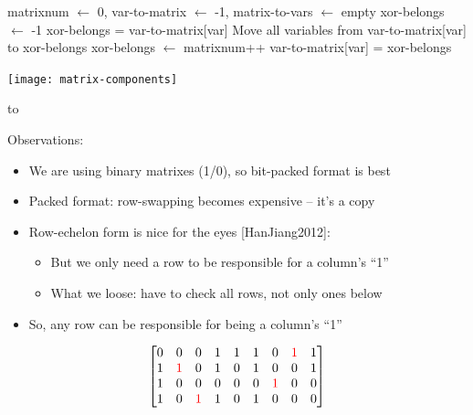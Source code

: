 \documentclass[aspectratio=196]{slides}
\def\TITLE#1{\hbox to \linewidth{\large #1\hfill}}
\def\BOTTOM{\vfill\newpage}
\def\SLIDE#1{\BOTTOM\TITLE{#1}}
\begin{document}
\begin{minipage}{0.7\textwidth}
\begin{algorithmic}[1]
    \State matrixnum $\gets$ 0, var-to-matrix $\gets$ -1, matrix-to-vars $\gets$ empty
        \State xor-belongs $\gets$ -1
                 {xor-belongs = var-to-matrix[var]}
                    \State Move all variables from var-to-matrix[var] to xor-belongs
                \EndIf
            \EndIf
        \EndFor
            \State xor-belongs $\gets$ matrixnum++
        \EndIf
            \State var-to-matrix[var] = xor-belongs
        \EndFor
    \EndFor \label{line:findonexor-base-end}
\EndFunction
\end{algorithmic}
\end{minipage}
\begin{minipage}{0.3\textwidth}
\texttt{[image: matrix-components]}
\end{minipage}
\vfill
\newpage
\SLIDE{CDCL(T) Gauss-Jordan Elimination: None of that row swapping please!}
\vspace{2ex}

Observations:
\begin{itemize}
\item We are using binary matrixes (1/0), so bit-packed format is best
\item Packed format: row-swapping becomes expensive -- it's a copy
\item Row-echelon form is nice for the eyes [HanJiang2012]:
\begin{itemize}
\item But we only need a row to be responsible for a column's ``1''
\item What we loose: have to check all rows, not only ones below
\end{itemize}
\item So, any row can be responsible for being a column's ``1''
\end{itemize}

\begin{center}
\begin{minipage}{0.2\linewidth}
\[
\begin{bmatrix}
0 & 0 & 0 & 1 & 1 & 1 & 0 & \color{red}1 & 1\\
1 & \color{red}1 & 0 & 1 & 0 & 1 & 0 & 0 & 1\\
1 &0 &0 & 0 & 0 & 0 & \color{red}1 & 0 & 0\\
1 &0 &\color{red}1 & 1 & 0 & 1 & 0 & 0 & 0\\
\end{bmatrix}
\]
\end{minipage}
\end{center}
\end{document}
